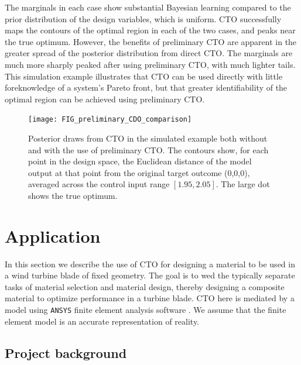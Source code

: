 \documentclass[12pt]{article}
\begin{document}
%
The marginals in each case show substantial Bayesian learning compared to the prior distribution of the design variables, which is uniform. 
%
CTO successfully maps the contours of the optimal region in each of the two cases, and peaks near the true optimum. 
%
However, the benefits of preliminary CTO are apparent in the greater spread of the posterior distribution from direct CTO.
%
The marginals are much more sharply peaked after using preliminary CTO, with much lighter tails.
%
%
This simulation example illustrates that CTO can be used directly with little foreknowledge of a system's Pareto front, but that greater identifiability of the optimal region can be achieved using preliminary CTO.

\begin{figure}
\centering
\texttt{[image: FIG\_preliminary\_CDO\_comparison]}
\caption{Posterior draws from CTO in the simulated example both without and with the use of preliminary CTO. The contours show, for each point in the design space, the Euclidean distance of the model output at that point from the original target outcome (0,0,0), averaged across the control input range $[1.95,2.05]$. The large dot shows the true optimum.}
\label{fig:toy_sim_results}
\end{figure}



\section{Application}\label{application}

In this section we describe the use of CTO for designing a material to be used in a wind turbine blade of fixed geometry. 
%
The goal is to wed the typically separate tasks of material selection and material design, thereby designing a composite material to optimize performance in a turbine blade.
%
CTO here is mediated by a model using \texttt{ANSYS} finite element analysis software \citep{ansys}. 
We assume that the finite element model is an accurate representation of reality.

\subsection{Project background}
\end{document}
